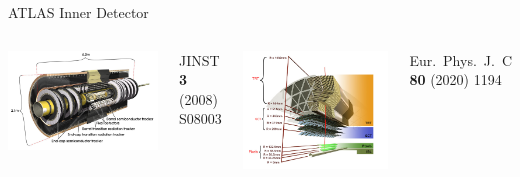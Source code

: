 \documentclass[11pt, xcolor={dvipsnames}, aspectratio=169]{beamer}
\begin{document}

\begin{frame}{ATLAS Inner Detector}
  \begin{columns}
    \centering\footnotesize

    \includegraphics[width=\textwidth]{atlas/atlas_indet_1}

    JINST \textbf{3} (2008) S08003

    \centering\footnotesize

    \includegraphics[width=\textwidth]{atlas/atlas_indet_2_with_ibl}

    Eur.\ Phys.\ J.\ C \textbf{80} (2020) 1194
  \end{columns}
\end{frame}
\end{document}
